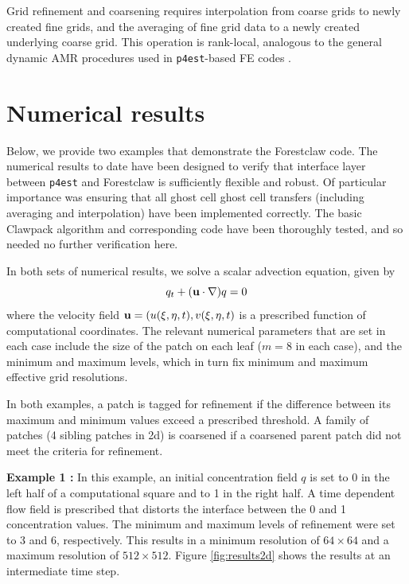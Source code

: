 \documentclass{IOS-Book-Article}     %
\newcommand{\clawpack}{{\sc Clawpack}\xspace}
\newcommand{\forestclaw}{Forestclaw\xspace}
\newcommand{\pforest}{\texttt{p4est}\xspace}
\newcommand{\Fig}[1]{Figure \ref{fig:#1}}
\begin{document}
Grid refinement and coarsening requires interpolation from coarse grids
to newly created fine grids, and the averaging of fine grid data to a newly
created underlying coarse grid.  This operation is rank-local, analogous to the
general dynamic AMR procedures used in \pforest-based FE codes \cite[Fig.\
4]{BursteddeGhattasStadlerEtAl08}.

\section{Numerical results}
Below, we provide two examples that demonstrate the \forestclaw code.
The numerical results to date have been designed to verify that
interface layer between \pforest and \forestclaw is sufficiently
flexible and robust.  Of particular importance was ensuring that all
ghost cell ghost cell transfers (including averaging and
interpolation) have been implemented correctly.
The basic \clawpack algorithm and corresponding code have been
thoroughly tested, and so needed no further verification here.

In both sets of numerical results, we solve a scalar advection
equation, given by
\begin{equation*}
q_t + ({\bf u}\cdot \nabla) q = 0
\end{equation*}
\noindent
where the velocity field ${\bf u} = (u(\xi,\eta,t), v(\xi,\eta,t)$ is
a prescribed function of computational coordinates.  The relevant
numerical parameters that are set in each case include the size of the
patch on each leaf ($m=8$ in each case), and the minimum and maximum
levels, which in turn fix minimum and maximum effective grid
resolutions.

In both examples, a patch is tagged for refinement if the
difference between its maximum and minimum values exceed a prescribed
threshold.  A family of patches (4 sibling patches in 2d) is coarsened
if a coarsened parent patch did not meet the criteria for refinement.

\noindent
{\bf Example 1 : } In this example, an initial concentration field $q$
is set to 0 in the left half of a computational square and to 1 in the
right half.  A time dependent flow field is prescribed that distorts
the interface between the 0 and 1 concentration values.  The minimum
and maximum levels of refinement were set to 3 and 6, respectively.
This results in a minimum resolution of $64 \times 64$ and a maximum
resolution of $512 \times 512$. \Fig{results2d} shows the results
at an intermediate time step.
\end{document}
